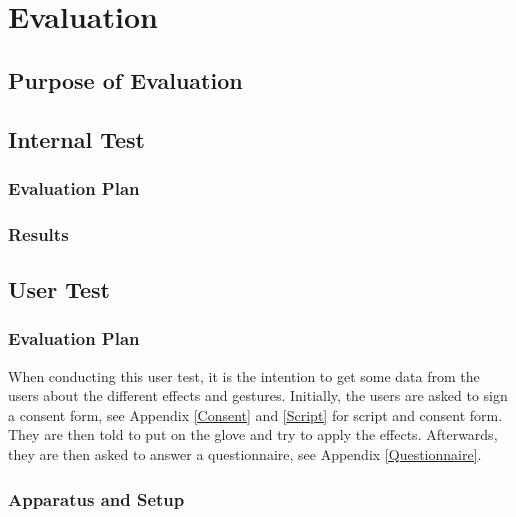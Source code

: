 \chapter{Evaluation}

\section{Purpose of Evaluation}


\section{Internal Test}

\subsection{Evaluation Plan}

\subsection{Results}


\section{User Test}

\subsection{Evaluation Plan}

When conducting this user test, it is the intention to get some data from the users about the different effects and gestures. 
Initially, the users are asked to sign a consent form, see Appendix \ref{Consent} and \ref{Script} for script and consent form. They are then told to put on the glove and try to apply the effects. Afterwards, they are then asked to answer a questionnaire, see Appendix \ref{Questionnaire}. 

\subsection{Apparatus and Setup}



\begin{minipage}{\linewidth}%
\label{Setup}
\end{minipage}\\

